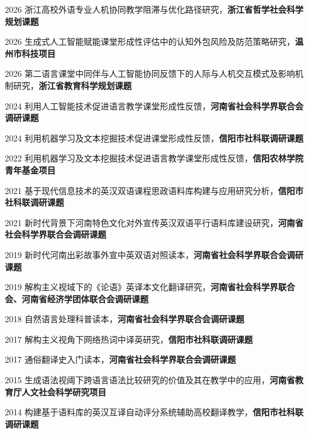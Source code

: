 \documentclass[11pt,a4paper]{article}
\begin{document}
\begin{tablist}[itemsep=0.10em, parsep=0.08em]
\item[2026] 浙江高校外语专业人机协同教学阻滞与优化路径研究，\textbf{浙江省哲学社会科学规划课题}

\item[2026] 生成式人工智能赋能课堂形成性评估中的认知外包风险及防范策略研究，\textbf{温州市科技项目}

\item[2026] 第二语言课堂中同伴与人工智能协同反馈下的人际与人机交互模式及影响机制研究，\textbf{浙江省教育科学规划课题}

\item[2024] 利用人工智能技术促进语言教学课堂形成性反馈，\textbf{河南省社会科学界联合会调研课题}

\item[2024] 利用机器学习及文本挖掘技术促进课堂形成性反馈，\textbf{信阳市社科联调研课题}

\item[2022] 利用机器学习及文本挖掘技术促进语言教学课堂形成性反馈，\textbf{信阳农林学院青年基金项目}

\item[2021] 基于现代信息技术的英汉双语课程思政语料库构建与应用研究分析，\textbf{信阳市社科联调研课题}

\item[2021] 新时代背景下河南特色文化对外宣传英汉双语平行语料库建设研究，\textbf{河南省社会科学界联合会调研课题}

\item[2019] 新时代河南出彩故事外宣中英双语对照读本，\textbf{河南省社会科学界联合会调研课题}

\item[2019] 解构主义视域下的《论语》英译本文化翻译研究，\textbf{河南省社会科学界联合会、河南省经济学团体联合会调研课题}

\item[2018] 自然语言处理科普读本，\textbf{河南省社会科学界联合会调研课题}

\item[2017] 解构主义视角下网络热词中译英研究，\textbf{信阳市社科联调研课题}

\item[2017] 通俗翻译史入门读本，\textbf{河南省社会科学界联合会调研课题}

\item[2015] 生成语法视阈下跨语言语法比较研究的价值及其在教学中的应用，\textbf{河南省教育厅人文社会科学研究项目}

\item[2014] 构建基于语料库的英汉互译自动评分系统辅助高校翻译教学，\textbf{信阳市社科联调研课题}
\end{tablist}
\end{document}
